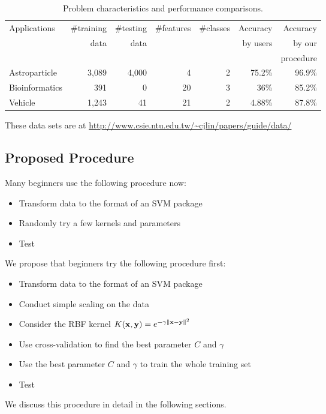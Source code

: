 \documentclass[12pt]{article}
\def\bx{{\bf x}}
\def\by{{\bf y}}
\begin{document}
\begin{table}
\caption{Problem characteristics and performance comparisons.}
\label{accuracy}
\begin{center}
\begin{tabular}{@{}l|r|r|r|r|r|r@{}}
Applications&\#training&\#testing&\#features&\#classes&Accuracy&Accuracy \\
                &data      &data     &          &       &by users&by our   \\
                &          &         &          &       &        &procedure\\
\hline
Astroparticle\footnotemark[1] & 3,089 & 4,000 & 4 & 2 & 75.2\% & 96.9\% \\
Bioinformatics\footnotemark[2] & 391 & 0\footnotemark[4] & 20 & 3 & 36\% & 85.2\% \\
Vehicle\footnotemark[3] & 1,243 & 41 & 21 & 2 & 4.88\% & 87.8\%
\end{tabular}
\end{center}
\end{table}


These data sets are at \url{http://www.csie.ntu.edu.tw/~cjlin/papers/guide/data/}

\subsection{Proposed Procedure}

Many beginners use the following procedure now:
\begin{itemize}
\item Transform data to the format of an SVM package
\item Randomly try a few kernels and parameters
\item Test
\end{itemize}
We propose that beginners try the following procedure first:
\begin{itemize}
\item Transform data to the format of an SVM package
\item Conduct simple scaling on the data
\item Consider the RBF kernel $K(\bx,\by)=e^{-\gamma\|\bx-\by\|^2}$ 
\item Use cross-validation to find the best parameter
      $C$ and $\gamma$
\item Use the best parameter $C$ and $\gamma$ to train the 
whole training set\footnotemark[5]
\item Test
\end{itemize}
We discuss this procedure in detail in the following 
sections.
\end{document}
